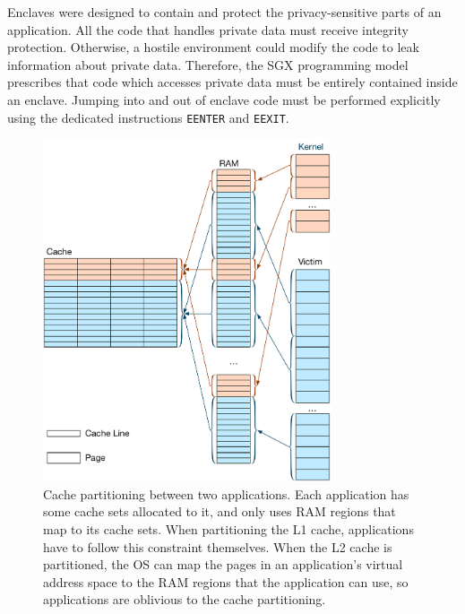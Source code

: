 
Enclaves were designed to contain and protect the privacy-sensitive parts of an
application. All the code that handles private data must receive integrity
protection. Otherwise, a hostile environment could modify the code to leak
information about private data. Therefore, the SGX programming model prescribes
that code which accesses private data must be entirely contained inside an
enclave. Jumping into and out of enclave code must be performed explicitly
using the dedicated instructions \texttt{EENTER} and \texttt{EEXIT}.


%


\begin{figure}[hbt]
  \centering
  \includegraphics[width=85mm]{figures/cache_partitions.pdf}
  \caption{
    Cache partitioning between two applications. Each application has some
    cache sets allocated to it, and only uses RAM regions that map to its cache
    sets. When partitioning the L1 cache, applications have to follow this
    constraint themselves. When the L2 cache is partitioned, the OS can map the
    pages in an application's virtual address space to the RAM regions that the
    application can use, so applications are oblivious to the cache
    partitioning.
  }
  \label{fig:cache_partitions}
\end{figure}


